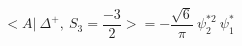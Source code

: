 \begin{equation}
<A|~\Delta^{+},~ S_3=\frac{-3}{2} >=- \frac{\sqrt{6}}{\pi} ~\psi_2^{*2}~\psi_1^*
\end{equation}

